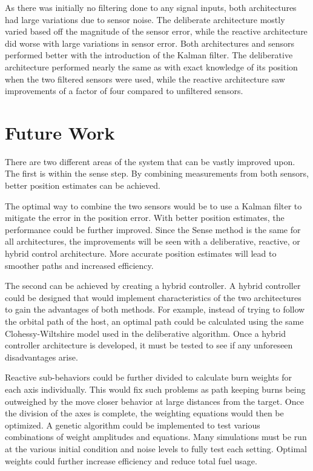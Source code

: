 \documentclass[journal, 10pt]{IEEEtran}
\begin{document}
As there was initially no filtering done to any signal inputs, both architectures had large variations due to sensor noise. The deliberate architecture mostly varied based off the magnitude of the sensor error, while the reactive architecture did worse with large variations in sensor error. Both architectures and sensors performed better with the introduction of the Kalman filter. The deliberative architecture performed nearly the same as with exact knowledge of its position when the two filtered sensors were used, while the reactive architecture saw improvements of a factor of four compared to unfiltered sensors.

\section{Future Work}
There are two different areas of the system that can be vastly improved upon.  The first is within the sense step.  By combining measurements from both sensors, better position estimates can be achieved.

The optimal way to combine the two sensors would be to use a Kalman filter to mitigate the error in the position error.  With better position estimates, the performance could be further improved.  Since the Sense method is the same for all architectures, the improvements will be seen with a deliberative, reactive, or hybrid control architecture.  More accurate position estimates will lead to smoother paths and increased efficiency. 

The second can be achieved by creating a hybrid controller. A hybrid controller could be designed that would implement characteristics of the two architectures to gain the advantages of both methods.  For example, instead of trying to follow the orbital path of the host, an optimal path could be calculated using the same Clohessy-Wiltshire model used in the deliberative algorithm.  Once a hybrid controller architecture is developed, it must be tested to see if any unforeseen disadvantages arise.

Reactive sub-behaviors could be further divided to calculate burn weights for each axis individually.  This would fix such problems as path keeping burns being outweighed by the move closer behavior at large distances from the target.  Once the division of the axes is complete, the weighting equations would then be optimized.  A genetic algorithm could be implemented to test various combinations of weight amplitudes and equations.  Many simulations must be run at the various initial condition and noise levels to fully test each setting. Optimal weights could further increase efficiency and reduce total fuel usage.

\nocite{*}

{}
\end{document}
